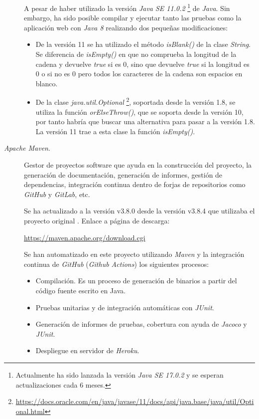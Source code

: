 \begin{description}
		A pesar de haber utilizado la versión \textit{Java SE 11.0.2} \footnote{Actualmente ha sido lanzada la versión \textit{Java SE 17.0.2} y se esperan actualizaciones cada 6 meses.} de \textit{Java}. Sin embargo, ha sido posible compilar y ejecutar tanto las pruebas como la aplicación web con \textit{Java 8} realizando dos pequeñas modificaciones:
		\begin{itemize}
			\item De la versión 11 se ha utilizado el método \textit{isBlank()} de la clase \textit{String}. Se diferencia de \textit{isEmpty()} en que no comprueba la longitud de la cadena y devuelve \textit{true} si es 0, sino que devuelve \textit{true} si la longitud es 0 o si no es 0 pero todos los caracteres de la cadena son espacios en blanco.
			\item De la clase \textit{java.util.Optional} \footnote{\url{https://docs.oracle.com/en/java/javase/11/docs/api/java.base/java/util/Optional.html}}, soportada desde la versión 1.8, se utiliza la función \textit{orElseThrow()}, que se soporta desde la versión 10, por tanto habría que buscar una alternativa para pasar a la versión 1.8. La versión 11 trae a esta clase la función \textit{isEmpty()}.
		\end{itemize}
	\item[\textit{Apache Maven}.] Gestor de proyectos software que ayuda en la construcción del proyecto, la generación de documentación, generación de informes, gestión de dependencias, integración continua dentro de forjas de repositorios como \textit{GitHub} y \textit{GitLab}, etc. 
	
		Se ha actualizado a la versión v3.8.0 desde la versión  v3.8.4 que utilizaba el proyecto original \cite{TFGPrevio}. Enlace a página de descarga:
		
		\url{https://maven.apache.org/download.cgi}
		
		Se han automatizado en este proyecto utilizando \textit{Maven} y la integración continua de \textit{GitHub} (\textit{Github Actions}) los siguientes procesos:
		\begin{itemize}
			\item Compilación. Es un proceso de generación de binarios a partir del código fuente escrito en Java.
			\item Pruebas unitarias y de integración automáticas con \textit{JUnit}.
			\item Generación de informes de pruebas, cobertura con ayuda de \textit{Jacoco} y \textit{JUnit}.
			\item Despliegue en servidor de \textit{Heroku}.
		\end{itemize}
	

\end{description}
